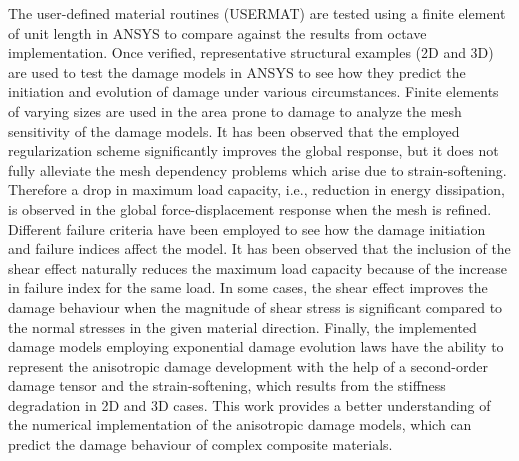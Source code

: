 \documentclass[12pt,a4paper,twoside,openright]{report}
\begin{document}
\indent\indent\indent The user-defined material routines (USERMAT) are tested using a finite element of unit length in ANSYS to compare against the results from octave implementation. Once verified, representative structural examples (2D and 3D) are used to test the damage models in ANSYS to see how they predict the initiation and evolution of damage under various circumstances. Finite elements of varying sizes are used in the area prone to damage to analyze the mesh sensitivity of the damage models. It has been observed that the employed regularization scheme significantly improves the global response, but it does not fully alleviate the mesh dependency problems which arise due to strain-softening. Therefore a drop in maximum load capacity, i.e., reduction in energy dissipation, is observed in the global force-displacement response when the mesh is refined. Different failure criteria have been employed to see how the damage initiation and failure indices affect the model. It has been observed that the inclusion of the shear effect naturally reduces the maximum load capacity because of the increase in failure index for the same load. In some cases, the shear effect improves the damage behaviour when the magnitude of shear stress is significant compared to the normal stresses in the given material direction. Finally, the implemented damage models employing exponential damage evolution laws have the ability to represent the anisotropic damage development with the help of a second-order damage tensor and the strain-softening, which results from the stiffness degradation in 2D and 3D cases. This work provides a better understanding of the numerical implementation of the anisotropic damage models, which can predict the damage behaviour of complex composite materials.\\
\end{document}
